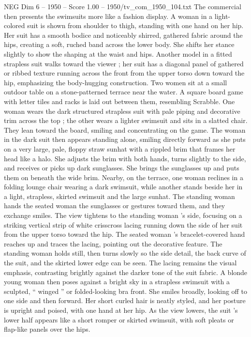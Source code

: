 \begin{textsample}{NEG Dim 6 – 1950 – Score 1.00 – 1950/tv\_com\_1950\_104.txt}
The commercial then presents the swimsuits more like a fashion display.
A woman in a light-colored suit is shown from shoulder to thigh, standing with one hand on her hip.
Her suit has a smooth bodice and noticeably shirred, gathered fabric around the hips, creating a soft, ruched band across the lower body.
She shifts her stance slightly to show the shaping at the waist and hips.
Another model in a fitted strapless suit walks toward the viewer ; her suit has a diagonal panel of gathered or ribbed texture running across the front from the upper torso down toward the hip, emphasizing the body-hugging construction.
Two women sit at a small outdoor table on a stone-patterned terrace near the water.
A square board game with letter tiles and racks is laid out between them, resembling Scrabble.
One woman wears the dark structured strapless suit with pale piping and decorative trim across the top ; the other wears a lighter swimsuit and sits in a slatted chair.
They lean toward the board, smiling and concentrating on the game.
The woman in the dark suit then appears standing alone, smiling directly forward as she puts on a very large, pale, floppy straw sunhat with a rippled brim that frames her head like a halo.
She adjusts the brim with both hands, turns slightly to the side, and receives or picks up dark sunglasses.
She brings the sunglasses up and puts them on beneath the wide brim.
Nearby, on the terrace, one woman reclines in a folding lounge chair wearing a dark swimsuit, while another stands beside her in a light, strapless, skirted swimsuit and the large sunhat.
The standing woman hands the seated woman the sunglasses or gestures toward them, and they exchange smiles.
The view tightens to the standing woman ’s side, focusing on a striking vertical strip of white crisscross lacing running down the side of her suit from the upper torso toward the hip.
The seated woman ’s bracelet-covered hand reaches up and traces the lacing, pointing out the decorative feature.
The standing woman holds still, then turns slowly so the side detail, the back curve of the suit, and the skirted lower edge can be seen.
The lacing remains the visual emphasis, contrasting brightly against the darker tone of the suit fabric.
A blonde young woman then poses against a bright sky in a strapless swimsuit with a sculpted, “ winged ” or folded-looking bra front.
She smiles broadly, looking off to one side and then forward.
Her short curled hair is neatly styled, and her posture is upright and poised, with one hand at her hip.
As the view lowers, the suit ’s lower half appears like a short romper or skirted swimsuit, with soft pleats or flap-like panels over the hips.

\end{textsample}
